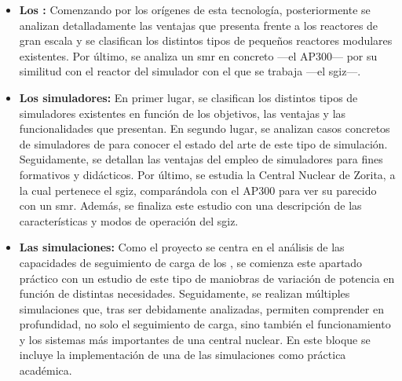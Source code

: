 \begin{itemize}
  \item \textbf{Los :} Comenzando por los orígenes de esta tecnología, posteriormente se analizan detalladamente las ventajas que presenta frente a los reactores de gran escala y se clasifican los distintos tipos de pequeños reactores modulares existentes. Por último, se analiza un \acrshort{smr} en concreto ---el AP300--- por su similitud con el reactor del simulador con el que se trabaja ---el \acrshort{sgiz}---.
  \item \textbf{Los simuladores:} En primer lugar, se clasifican los distintos tipos de simuladores existentes en función de los objetivos, las ventajas y las funcionalidades que presentan. En segundo lugar, se analizan casos concretos de simuladores de  para conocer el estado del arte de este tipo de simulación. Seguidamente, se detallan las ventajas del empleo de simuladores para fines formativos y didácticos. Por último, se estudia la Central Nuclear de Zorita, a la cual pertenece el \acrshort{sgiz}, comparándola con el AP300 para ver su parecido con un \acrshort{smr}. Además, se finaliza este estudio con una descripción de las características y modos de operación del \acrshort{sgiz}.
  \item \textbf{Las simulaciones:} Como el proyecto se centra en el análisis de las capacidades de seguimiento de carga de los , se comienza este apartado práctico con un estudio de este tipo de maniobras de variación de potencia en función de distintas necesidades. Seguidamente, se realizan múltiples simulaciones que, tras ser debidamente analizadas, permiten comprender en profundidad, no solo el seguimiento de carga, sino también el funcionamiento y los  sistemas más importantes de una central nuclear. En este bloque se incluye la implementación de una de las simulaciones como práctica académica.
\end{itemize}